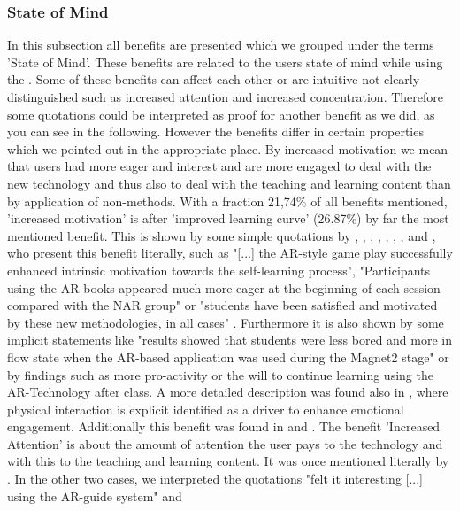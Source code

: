 \subsubsection{State of Mind}
In this subsection all benefits are presented which we grouped under the terms 'State of Mind'. These benefits are related to the users state of mind while using the \AR \appns. Some of these benefits can affect 
each other or are intuitive not clearly distinguished such as increased attention and increased concentration. Therefore some quotations could be interpreted as proof for another benefit as we did, as you can see in the following.
However the benefits differ in certain properties which we pointed out in the appropriate place.
By increased motivation we mean that users had more eager and interest and are more engaged to deal with the new technology and thus also to deal with the teaching and learning content than by application of non-\AR methods. With a fraction 21,74\% of all benefits mentioned, 
'increased motivation' is after 'improved learning curve' (26.87\%) by far the most mentioned benefit. This is shown by some simple quotations by \cite{Dunser.2012}, \cite{Iwata.2011}, 
\cite{Kamarainen.2013}, \cite{Liu.2009b}, \cite{MartinGutierrez.2011}, \cite{MartinGutierrez.2011}, \cite{Redondo.2013}, \cite{VateULan.2012} and \cite{Yen.2013}, who present this benefit literally, such as "[...] the AR-style game play successfully enhanced intrinsic motivation towards the self-learning process"\autocite[113]{Iwata.2011}, "Participants 
using the AR books appeared much more eager at the beginning of each session compared with the NAR group"\autocite[112]{Dunser.2012} or "students have been satisfied and motivated by these new methodologies, in all cases"
\autocite[et.al.][60]{Redondo.2013}. Furthermore it is also shown by some implicit statements like "results showed that students were less bored and more in flow state
when the AR-based application was used during the Magnet2 stage"\autocite[8]{Ibanez.2014} or by findings such as more pro-activity\autocite[10]{Chang.2014}\mulcit\autocite[187]{Zhang.2014} or the will to continue learning using
the AR-Technology after class\autocite[8]{Liu.2009b}. A more detailed description was found also in \cite[8]{Iwata.2011}, where physical interaction is explicit identified as a driver to enhance emotional
engagement. Additionally this benefit was found in \cite[322]{Li.2011} and \cite[448]{Hou.2013}.
The benefit 'Increased Attention' is about the amount of attention the user pays to the technology and with this to the teaching and learning content. It was once mentioned literally by \cite[894]{VateULan.2012}. In the other two cases, we interpreted the quotations "felt it interesting [...] using the AR-guide system"\autocite[194]{Chen.2008} and 
